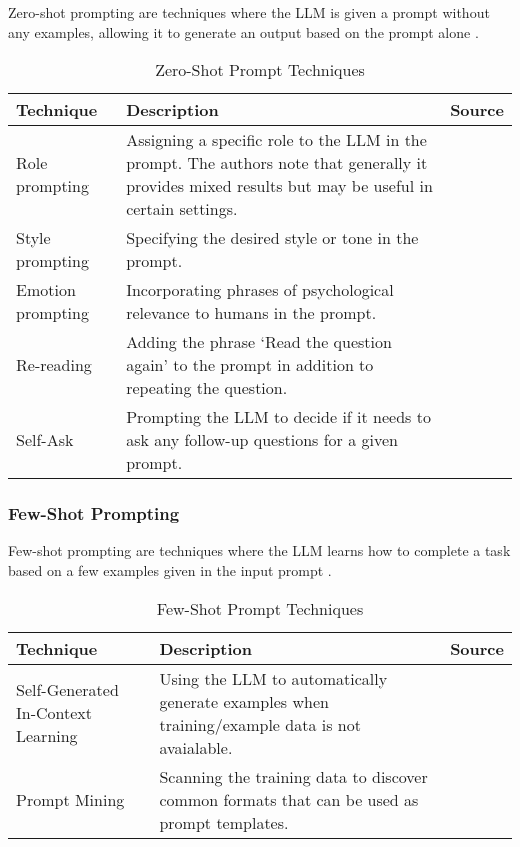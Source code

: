 Zero-shot prompting are techniques where the LLM is given a prompt without any examples, allowing it to generate an output based on the prompt alone \parencite{prompt1}.

\begin{table}[h!]
    \centering
    \begin{tabular}{p{3cm} p{8cm} p{2cm}}
        \toprule
        \textbf{Technique} & \textbf{Description} & \textbf{Source} \\
        \midrule
        \raggedright
        Role prompting & Assigning a specific role to the LLM in the prompt. The authors note that generally it provides mixed results but may be useful in certain settings.  & \textcite{role1} \\
        \hline
        \raggedright
        Style prompting & Specifying the desired style or tone in the prompt. & \textcite{style} \\
        \hline
        \raggedright
        Emotion prompting & Incorporating phrases of psychological relevance to humans in the prompt. & \textcite{emotion} \\
        \hline
        \raggedright
        Re-reading & Adding the phrase `Read the question again' to the prompt in addition to repeating the question. & \textcite{rereading} \\
        \hline
        \raggedright
        Self-Ask & Prompting the LLM to decide if it needs to ask any follow-up questions for a given prompt. &  \textcite{selfask} \\
        \bottomrule
    \end{tabular}
    \caption{Zero-Shot Prompt Techniques}\label{tab:zero_shot}
\end{table}

\FloatBarrier{}

\subsubsection{Few-Shot Prompting}

Few-shot prompting are techniques where the LLM learns how to complete a task based on a few examples given in the input prompt \parencite{prompt1}.

\begin{table}[h!]
    \centering
    \begin{tabular}{p{3cm} p{8cm} p{2cm}}
        \toprule
        \textbf{Technique} & \textbf{Description} & \textbf{Source} \\
        \midrule
        \raggedright
        Self-Generated In-Context Learning & Using the LLM to automatically generate examples when training/example data is not avaialable. & \textcite{self-generating} \\
        \hline
        \raggedright
        Prompt Mining & Scanning the training data to discover common formats that can be used as prompt templates. & \textcite{mining} \\
        \bottomrule
    \end{tabular}
    \caption{Few-Shot Prompt Techniques}\label{tab:few_shot}
\end{table}

